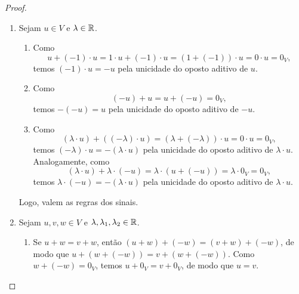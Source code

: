 \begin{proof}
\begin{enumerate}[leftmargin=*, align=left, label=\textbf{(\alph*)}]
\begin{enumerate}[label=\roman*.]
\[                            = \left(\frac{1}{\lambda}\lambda\right) \cdot u
                            = \frac{1}{\lambda} \cdot (\lambda \cdot u)
                            = \frac{1}{\lambda} \cdot 0_V
                            = 0_V.
                        \]
                    Logo, se $\lambda \cdot u = 0_V$, então $\lambda=0$ ou $u=0_V$.
                \end{enumerate}
            Logo, valem as propriedades de integridade. \blackproof
            \item Sejam $u \in V$ e $\lambda \in \mathbb{R}$.
                \begin{enumerate}[label=\roman*.]
                    \item Como
                        \[
                            u + (-1) \cdot u
                            = 1 \cdot u + (-1) \cdot u
                            = (1+(-1)) \cdot u
                            = 0 \cdot u
                            = 0_V,
                        \]
                    temos $(-1) \cdot u = -u$ pela unicidade do oposto aditivo de $u$.
                    \item Como
                        \[
                            (-u) + u = u + (-u) = 0_V,
                        \]
                    temos $-(-u)=u$ pela unicidade do oposto aditivo de $-u$.
                    \item Como
                        \[
                            (\lambda \cdot u) + ((-\lambda) \cdot u)
                            = (\lambda+(-\lambda)) \cdot u
                            = 0 \cdot u
                            = 0_V,
                        \]
                    temos $(-\lambda) \cdot u = -(\lambda \cdot u)$ pela unicidade do oposto aditivo de $\lambda \cdot u$. Analogamente, como
                        \[
                            (\lambda \cdot u) + \lambda \cdot (-u)
                            = \lambda \cdot (u+(-u))
                            = \lambda \cdot 0_V
                            = 0_V,
                        \]
                    temos $\lambda \cdot (-u) = -(\lambda \cdot u)$ pela unicidade do oposto aditivo de $\lambda \cdot u$.
                \end{enumerate}
            Logo, valem as regras dos sinais. \blackproof
            \item Sejam $u,v,w \in V$ e $\lambda,\lambda_1,\lambda_2 \in \mathbb{R}$.
                \begin{enumerate}[label=\roman*.]
                    \item Se $u+w=v+w$, então $(u+w)+(-w)=(v+w)+(-w)$, de modo que $u+(w+(-w))=v+(w+(-w))$. Como $w+(-w)=0_V$, temos $u+0_V=v+0_V$, de modo que $u=v$.

\end{enumerate}
\end{enumerate}
\end{proof}
